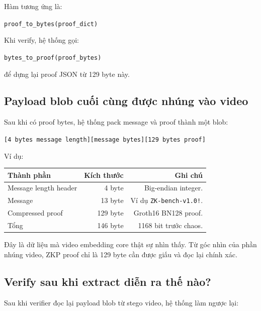 \documentclass[11pt,a4paper]{article}
\begin{document}
Hàm tương ứng là:

\begin{center}
\texttt{proof\_to\_bytes(proof\_dict)}
\end{center}

Khi verify, hệ thống gọi:

\begin{center}
\texttt{bytes\_to\_proof(proof\_bytes)}
\end{center}

để dựng lại proof JSON từ 129 byte này.

\subsection{Payload blob cuối cùng được nhúng vào video}

Sau khi có proof bytes, hệ thống pack message và proof thành một blob:

\begin{center}
\texttt{[4 bytes message length][message bytes][129 bytes proof]}
\end{center}

Ví dụ:

\begin{center}
\begin{tabular}{lrr}
\toprule
Thành phần & Kích thước & Ghi chú \\
\midrule
Message length header & 4 byte & Big-endian integer. \\
Message & 13 byte & Ví dụ \texttt{ZK-bench-v1.0!}. \\
Compressed proof & 129 byte & Groth16 BN128 proof. \\
\midrule
Tổng & 146 byte & 1168 bit trước chaos. \\
\bottomrule
\end{tabular}
\end{center}

Đây là dữ liệu mà video embedding core thật sự nhìn thấy. Từ góc nhìn của phần
nhúng video, ZKP proof chỉ là 129 byte cần được giấu và đọc lại chính xác.

\subsection{Verify sau khi extract diễn ra thế nào?}

Sau khi verifier đọc lại payload blob từ stego video, hệ thống làm ngược lại:
\end{document}
